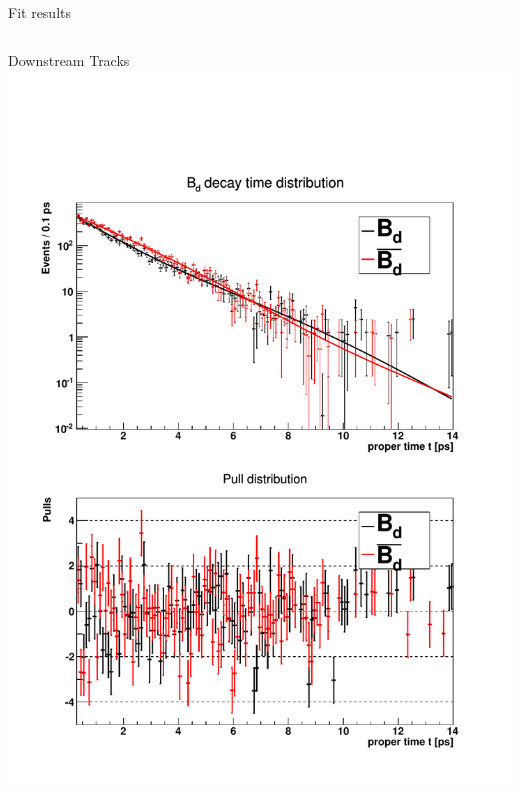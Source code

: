 \documentclass{beamer}
\begin{document}
\begin{frame}{Fit results}
\begin{columns}
\begin{block}{Downstream Tracks}
	\includegraphics[width=\textwidth]{decay_distribution_ds}
	\end{block}
	\end{columns}

	\end{frame}
	
\end{document}
